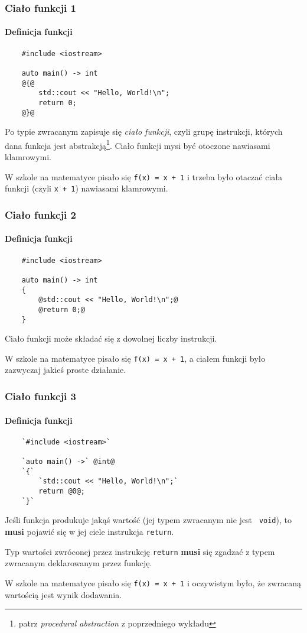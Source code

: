 \documentclass[aspectratio=169]{beamer}
\begin{document}
\begin{frame}[fragile]
    \frametitle{Ciało funkcji 1}
    \framesubtitle{Definicja funkcji}

    {\footnotesize
    \begin{lstlisting}
    #include <iostream>

    auto main() -> int
    @{@
        std::cout << "Hello, World!\n";
        return 0;
    @}@
    \end{lstlisting}}

    Po typie zwracanym zapisuje się \emph{ciało funkcji}, czyli grupę
    instrukcji, których dana funkcja jest abstrakcją\footnote{patrz
    \emph{procedural abstraction} z poprzedniego wykładu}. Ciało funkcji mysi
    być otoczone nawiasami klamrowymi.

    {\tiny
    W szkole na matematyce pisało się {\tt f(x) = x + 1} i trzeba było otaczać
    ciała funkcji (czyli {\tt x + 1}) nawiasami klamrowymi.
    }
\end{frame}

\begin{frame}[fragile]
    \frametitle{Ciało funkcji 2}
    \framesubtitle{Definicja funkcji}

    {\footnotesize
    \begin{lstlisting}
    #include <iostream>

    auto main() -> int
    {
        @std::cout << "Hello, World!\n";@
        @return 0;@
    }
    \end{lstlisting}}

    Ciało funkcji może składać się z dowolnej liczby instrukcji.

    {\tiny
    W szkole na matematyce pisało się {\tt f(x) = x + 1}, a ciałem funkcji było
    zazwyczaj jakieś proste działanie.
    }
\end{frame}

\begin{frame}[fragile]
    \frametitle{Ciało funkcji 3}
    \framesubtitle{Definicja funkcji}

    {\footnotesize
    \begin{lstlisting}
    `#include <iostream>`

    `auto main() ->` @int@
    `{`
        `std::cout << "Hello, World!\n";`
        return @0@;
    `}`
    \end{lstlisting}}

    Jeśli funkcja produkuje jakąś wartość (jej typem zwracanym nie jest {\tt
    void}), to \textbf{musi} pojawić się w jej ciele instrukcja {\tt return}.

    Typ wartości zwróconej przez instrukcję {\tt return} \textbf{musi} się
    zgadzać z typem zwracanym deklarowanym przez funkcję.

    {\tiny
    W szkole na matematyce pisało się {\tt f(x) = x + 1} i oczywistym było, że
    zwracaną wartością jest wynik dodawania.
    }
\end{frame}
\end{document}

